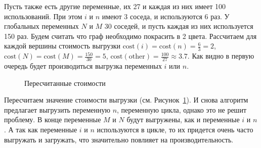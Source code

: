 Пусть также есть другие переменные, их 27 и каждая из них имеет 100 использований.
При этом $i$ и $n$ имеют 3 соседа, и используются 6 раз.
У глобальных переменных $N$ и $M$  30 соседей, и пусть каждая из них используется 150 раз.
Будем считать что граф необходимо покрасить в 2 цвета.
Рассчитаем для каждой вершины стоимость выгрузки $\text{cost}(i) = \text{cost}(n) = \frac{6}{3} = 2$, $\text{cost}(N) = \text{cost}(M) = \frac{150}{30} = 5$,
$\text{cost}(\text{other}) = \frac{100}{27} \approx 3.7$.
Как видно в первую очередь будет производиться выгрузка переменных $i$ или $n$.

\begin{figure}[H]
    \centering
    \caption{Пересчитанные стоимости}
    \label{fig:chatin_problem_2}
\end{figure}

Пересчитаем значение стоимости выгрузки (см. Рисунок~\ref{fig:chatin_problem_2}). И снова алгоритм предлагает
выгрузить переменную $n$, переменную цикла, однако это не решит проблему.
В конце переменные $M$ и $N$ будут выгружены, как и переменные $i$ и $n$.
А так как переменные $i$ и $n$ используются в цикле, то их придется очень часто выгружать и загружать, что
значительно повлияет на производительность.
